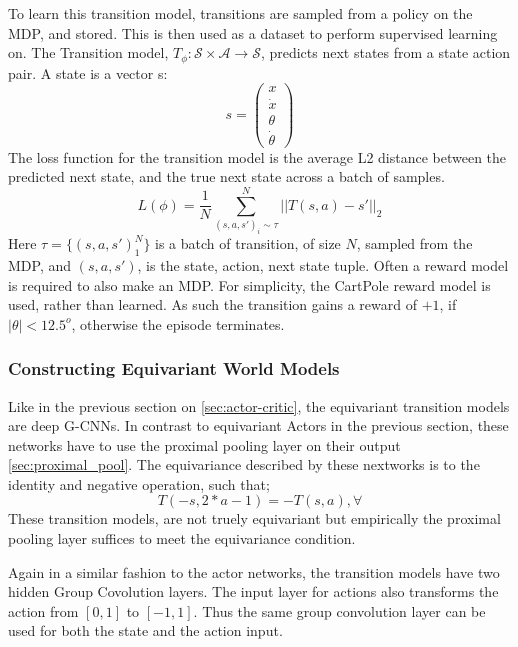 To learn this transition model, transitions are sampled from a policy on the MDP, and stored. This is then used as a dataset to perform supervised learning on. The Transition model, $T_\phi: \mathcal{S} \times \mathcal{A} \rightarrow \mathcal{S}$, predicts next states from a state action pair. A state is a vector s:
\begin{equation}
	s = \begin{pmatrix}
		x       \\
		\dot{x} \\
		\theta  \\
		\dot{\theta}
	\end{pmatrix}
\end{equation}
The loss function for the transition model is the average L2 distance between the predicted next state, and the true next state across a batch of samples.
\begin{equation}
	L(\phi) = \frac{1}{N}\sum^N_{(s, a, s')_i \sim \mathcal \tau} ||T(s, a) - s'||_2
\end{equation}
Here $\tau = \{(s, a , s')_1^N\}$ is a batch of transition, of size $N$, sampled from the MDP, and $(s, a, s')$, is the state, action, next state tuple. Often a reward model is required to also make an MDP. For simplicity, the CartPole reward model is used, rather than learned. As such the transition gains a reward of $+1$, if $|\theta| < 12.5^o$, otherwise the episode terminates.

\subsubsection{Constructing Equivariant World Models}
Like in the previous section on \ref{sec:actor-critic}, the equivariant transition models are deep G-CNNs. In contrast to equivariant Actors in the previous section, these networks have to use the proximal pooling layer on their output \ref{sec:proximal_pool}. The equivariance described by these nextworks is to the identity and negative operation, such that;
\begin{equation}
	T(- s, 2*a - 1) =  -T(s, a), \forall
\end{equation}
These transition models, are not truely equivariant but empirically the proximal pooling layer suffices to meet the equivariance condition.

Again in a similar fashion to the actor networks, the transition models have two hidden Group Covolution layers. The input layer for actions also transforms the action from $[0, 1]$ to $[-1, 1]$. Thus the same group convolution layer can be used for both the state and the action input.

